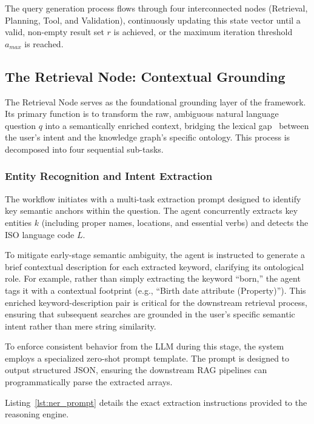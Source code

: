 The query generation process flows through four interconnected nodes (Retrieval, Planning, Tool, and Validation), continuously updating this state vector until a valid, non-empty result set $r$ is achieved, or the maximum iteration threshold $a_{max}$ is reached.

\subsection{The Retrieval Node: Contextual Grounding}
\label{sec:retrieval_node}
The Retrieval Node serves as the foundational grounding layer of the framework. Its primary function is to transform the raw, ambiguous natural language question $q$ into a semantically enriched context, bridging the lexical gap~\cite{hoffner_survey_2017} between the user's intent and the knowledge graph's specific ontology. This process is decomposed into four sequential sub-tasks.

\subsubsection{Entity Recognition and Intent Extraction}
The workflow initiates with a multi-task extraction prompt designed to identify key semantic anchors within the question. The agent concurrently extracts key entities $k$ (including proper names, locations, and essential verbs) and detects the ISO language code $L$. 

To mitigate early-stage semantic ambiguity, the agent is instructed to generate a brief contextual description for each extracted keyword, clarifying its ontological role. For example, rather than simply extracting the keyword ``born,'' the agent tags it with a contextual footprint (e.g., ``Birth date attribute (Property)''). This enriched keyword-description pair is critical for the downstream retrieval process, ensuring that subsequent searches are grounded in the user's specific semantic intent rather than mere string similarity.

To enforce consistent behavior from the LLM during this stage, the system employs a specialized zero-shot prompt template. The prompt is designed to output structured JSON, ensuring the downstream RAG pipelines can programmatically parse the extracted arrays. 

\newpage

Listing~\ref{lst:ner_prompt} details the exact extraction instructions provided to the reasoning engine.


